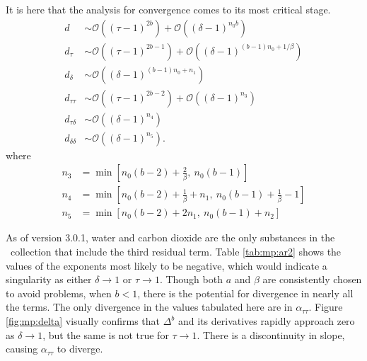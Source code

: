 It is here that the analysis for convergence comes to its most critical stage.  
\begin{subequations}
\begin{align}
d &\sim \mathcal{O}\left((\tau-1)^{2b}\right) + \mathcal{O}\left((\delta-1)^{n_0 b}\right)\\
d_{\tau} &\sim \mathcal{O}\left((\tau-1)^{2b-1}\right) + \mathcal{O}\left((\delta-1)^{(b-1) n_0 + 1/\beta}\right)\\
d_{\delta} &\sim \mathcal{O}\left((\delta-1)^{(b-1) n_0 + n_1}\right)\\
d_{\tau\tau} &\sim \mathcal{O}\left((\tau-1)^{2b-2}\right) + \mathcal{O}\left((\delta-1)^{n_3}\right)\\
d_{\tau\delta} &\sim \mathcal{O}\left((\delta-1)^{n_4}\right)\\
d_{\delta\delta} &\sim \mathcal{O}\left((\delta-1)^{n_5}\right).
\end{align}
\end{subequations}
where
\begin{subequations}
\begin{align}
n_3 &= \min\left[ n_0(b-2) + \frac{2}{\beta},\ n_0(b-1)\right]\\
n_4 &= \min\left[ n_0(b-2) + \frac{1}{\beta} + n_1,\ n_0(b-1)+\frac{1}{\beta} -1\right]\\
n_5 &= \min\left[ n_0(b-2) + 2n_1,\ n_0(b-1) + n_2\right]
\end{align}
\end{subequations}

As of version 3.0.1, water and carbon dioxide are the only substances in the \PM\ collection that include the third residual term.  Table \ref{tab:mp:ar2} shows the values of the exponents most likely to be negative, which would indicate a singularity as either $\delta \rightarrow 1$ or $\tau \rightarrow 1$.  Though both $a$ and $\beta$ are consistently chosen to avoid problems, when $b < 1$, there is the potential for divergence in nearly all the terms.  The only divergence in the values tabulated here are in $\alpha_{\tau\tau}$.  Figure \ref{fig:mp:delta} visually confirms that $\Delta^b$ and its derivatives rapidly approach zero as $\delta\rightarrow 1$, but the same is not true for $\tau \rightarrow 1$.  There is a discontinuity in slope, causing $\alpha_{\tau\tau}$ to diverge.


